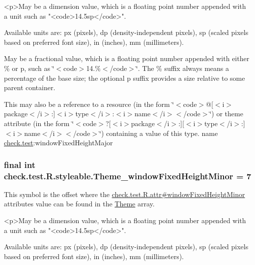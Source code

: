 \begin{DoxyVerb}      <p>May be a dimension value, which is a floating point number appended with a unit such as "<code>14.5sp</code>".
\end{DoxyVerb}
 Available units are\+: px (pixels), dp (density-\/independent pixels), sp (scaled pixels based on preferred font size), in (inches), mm (millimeters). 

May be a fractional value, which is a floating point number appended with either \% or p, such as \char`\"{}$<$code$>$14.\%$<$/code$>$\char`\"{}. The \% suffix always means a percentage of the base size; the optional p suffix provides a size relative to some parent container. 

This may also be a reference to a resource (in the form \char`\"{}$<$code$>$@\mbox{[}$<$i$>$package$<$/i$>$\+:\mbox{]}$<$i$>$type$<$/i$>$\+:$<$i$>$name$<$/i$>$$<$/code$>$\char`\"{}) or theme attribute (in the form \char`\"{}$<$code$>$?\mbox{[}$<$i$>$package$<$/i$>$\+:\mbox{]}\mbox{[}$<$i$>$type$<$/i$>$\+:\mbox{]}$<$i$>$name$<$/i$>$$<$/code$>$\char`\"{}) containing a value of this type.  name \hyperlink{namespacecheck_1_1test}{check.\+test}\+:window\+Fixed\+Height\+Major \hypertarget{classcheck_1_1test_1_1_r_1_1styleable_a8aa80c12e9d59fb6879aaf0273377731}{}
\subsubsection[{Theme\+\_\+window\+Fixed\+Height\+Minor}]{\setlength{\rightskip}{0pt plus 5cm}final int check.\+test.\+R.\+styleable.\+Theme\+\_\+window\+Fixed\+Height\+Minor = 7\hspace{0.3cm}{\ttfamily [static]}}\label{classcheck_1_1test_1_1_r_1_1styleable_a8aa80c12e9d59fb6879aaf0273377731}
This symbol is the offset where the \hyperlink{classcheck_1_1test_1_1_r_1_1attr_af64ced39b1ccba05a90dd6826cc30e0c}{check.\+test.\+R.\+attr\#window\+Fixed\+Height\+Minor} attribute\textquotesingle{}s value can be found in the \hyperlink{classcheck_1_1test_1_1_r_1_1styleable_acca726d02016a0cf607782ec3a436a81}{Theme} array.

\begin{DoxyVerb}      <p>May be a dimension value, which is a floating point number appended with a unit such as "<code>14.5sp</code>".
\end{DoxyVerb}
 Available units are\+: px (pixels), dp (density-\/independent pixels), sp (scaled pixels based on preferred font size), in (inches), mm (millimeters). 


